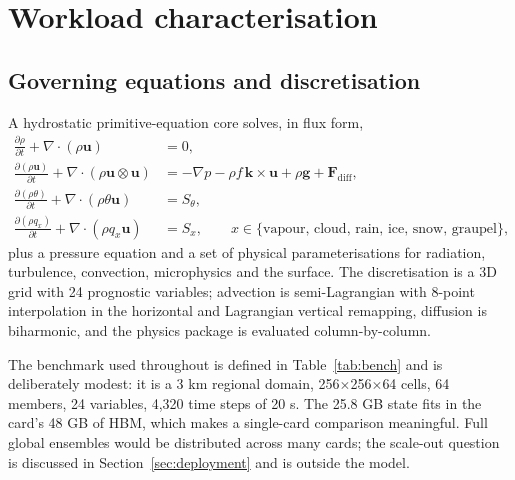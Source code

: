 \FloatBarrier
\section{Workload characterisation}\label{sec:workload}

\subsection{Governing equations and discretisation}
A hydrostatic primitive-equation core solves, in flux form,
\begin{align}
\frac{\partial \rho}{\partial t} + \nabla\cdot(\rho\mathbf{u}) &= 0,\\
\frac{\partial (\rho\mathbf{u})}{\partial t} + \nabla\cdot(\rho\mathbf{u}\otimes\mathbf{u})
  &= -\nabla p - \rho f\,\mathbf{k}\times\mathbf{u} + \rho\mathbf{g} + \mathbf{F}_{\mathrm{diff}},\\
\frac{\partial (\rho\theta)}{\partial t} + \nabla\cdot(\rho\theta\mathbf{u}) &= S_{\theta},\\
\frac{\partial (\rho q_x)}{\partial t} + \nabla\cdot(\rho q_x\mathbf{u}) &= S_{x},
  \qquad x \in \{\text{vapour, cloud, rain, ice, snow, graupel}\},
\end{align}
plus a pressure equation and a set of physical parameterisations for radiation, turbulence,
convection, microphysics and the surface. The discretisation is a 3D grid with 24 prognostic
variables; advection is semi-Lagrangian with 8-point interpolation in the horizontal and
Lagrangian vertical remapping, diffusion is biharmonic, and the physics package is evaluated
column-by-column.

The benchmark used throughout is defined in Table~\ref{tab:bench} and is deliberately modest: it
is a 3 km regional domain, 256$\times$256$\times$64 cells, 64 members, 24 variables, 4,320 time
steps of 20 s. The 25.8 GB state fits in the card's 48 GB of HBM, which makes a single-card
comparison meaningful. Full global ensembles would be distributed across many cards; the
scale-out question is discussed in Section~\ref{sec:deployment} and is outside the model.

